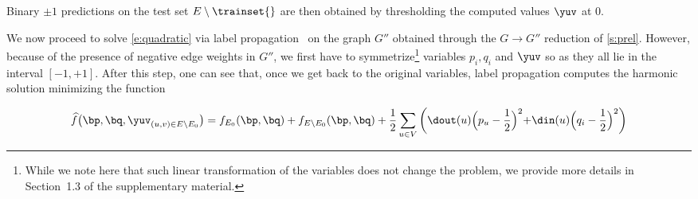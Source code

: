 Binary $\pm 1$ predictions on the test set $E\setminus \trainset{}$ are then obtained by
thresholding the computed values $\yuv$ at $0$.

\iffalse
********************************************************
and then solve for parameters $\{p_u, q_i\}_{u=1}^{|V|}$.
Yet, it may well be the case that some such parameters never occur in all these equations.\footnote
{
On the other hand, recall that no pairing $(u,v) \in E$ can occur more than once here, since \trainset{} is sampled without replacement.
}
This will happen precisely whenever $\Nout(u)$ or $\Nin(v)$ are not represented in \trainset{}. Specifically, if $E_0 \cap \Nout(u) = \emptyset$ then $p_u$ does not occur, and if $E_0 \cap \Nin(v) = \emptyset$ then $q_v$ does not occur. Hence, for each unsampled edge $(\ell,v)\in E\setminus \trainset{}$, we add to~(\ref{e:mlp2}) the equations
\[
p_{\ell}+q_v = 1+y_{\ell,v}~,
\]
motivated by the fact that $\E \left[\frac{1+y_{\ell,v}}{2}\,|\, (\ell,v)\right] =  \frac{p_{\ell}+q_v}{2}$. Similarly, we add to~(\ref{e:mlq2}) the equations
\[
p_u+q_{\ell} = 1+y_{u,\ell}~.
\]
This gives rise to the following set of equations
%
\begin{align}
p_{u}+ \frac{1}{\dout(u)}\,\sum_{v \in \Nout(u)} q_{v}
&=
\frac{1}{\dout(u)}\,\sum_{v=1}^{|V|} (1+\yuv), \qquad u = 1, \ldots, |V|~,\label{e:mlpa}\\
q_{v} +  \frac{1}{\din(v)}\,\sum_{u \in \Nin(v)} p_{u}
&=
\frac{1}{\din(v)}\,\sum_{u=1}^{|V|} (1+\yuv), \qquad v = 1, \ldots, |V|\,,\label{e:mlqa}\\
1+\yuv &= p_u+q_{v},\qquad\qquad\qquad\quad\,\, (u,v) \in E\setminus E_0~.\label{e:mlya}
\end{align}
%
*******************************************************
\fi

We now proceed to solve \eqref{e:quadratic} via label propagation~\autocite{LabelPropa03} on the
graph $G''$ obtained through the $G \rightarrow G''$ reduction of \autoref{s:prel}.
However, because of the presence of negative edge weights in $G''$, we first have to symmetrize\footnote{%
While we note here that such linear transformation of the variables does not change the problem, we
provide more details in Section~1.3 of the supplementary material.} variables $p_i, q_i$ and $\yuv$
so as they all lie in the interval $[-1,+1]$.
After this step, one can see that, once we get back to the original variables, label propagation
computes the harmonic solution minimizing the function

\begin{equation*}
{\widehat f}\big(\bp,\bq,{\yuv}_{(u,v) \in E\setminus E_0}\big)
= f_{E_0}(\bp,\bq) + f_{E\setminus E_0}(\bp,\bq)
+ \frac{1}{2}\sum_{u\in V}
\left(\dout(u)\Bigl(p_u-\frac{1}{2}\Bigl)^2+\din(u)\Bigl(q_i-\frac{1}{2}\Bigl)^2\right)
\end{equation*}

